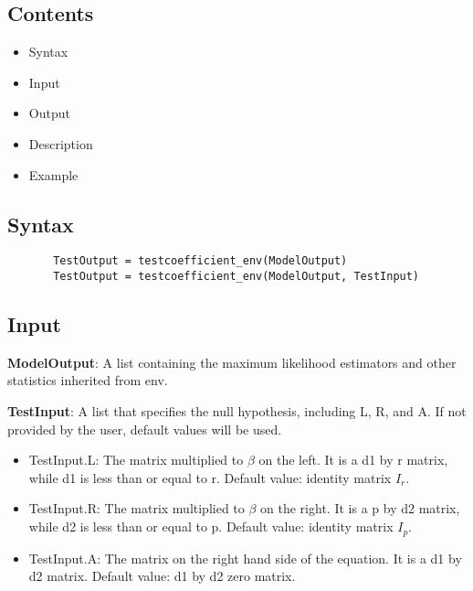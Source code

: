 \documentclass[a4paper,11pt,openany]{memoir}
\begin{document}
\subsection*{Contents}

\begin{itemize}
\setlength{\itemsep}{-1ex}
   \item Syntax
   \item Input
   \item Output
   \item Description
   \item Example
\end{itemize}


\subsection*{Syntax}


\begin{verbatim}       TestOutput = testcoefficient_env(ModelOutput)
       TestOutput = testcoefficient_env(ModelOutput, TestInput)\end{verbatim}
    

\subsection*{Input}

\begin{par}
\textbf{ModelOutput}: A list containing the maximum likelihood estimators and other statistics inherited from env.
\end{par} \vspace{1em}
\begin{par}
\textbf{TestInput}: A list that specifies the null hypothesis, including L, R, and A.  If not provided by the user, default values will be used.
\end{par} \vspace{1em}
\begin{itemize}
\setlength{\itemsep}{-1ex}
   \item TestInput.L: The matrix multiplied to $\beta$ on the left.  It is a d1 by r matrix, while d1 is less than or equal to r.  Default value: identity matrix $I_r$.
   \item TestInput.R: The matrix multiplied to $\beta$ on the right.  It is a p by d2 matrix, while d2 is less than or equal to p.  Default value: identity matrix $I_p$.
   \item TestInput.A: The matrix on the right hand side of the equation.  It is a d1 by d2 matrix.  Default value: d1 by d2 zero matrix.
\end{itemize}
\end{document}
